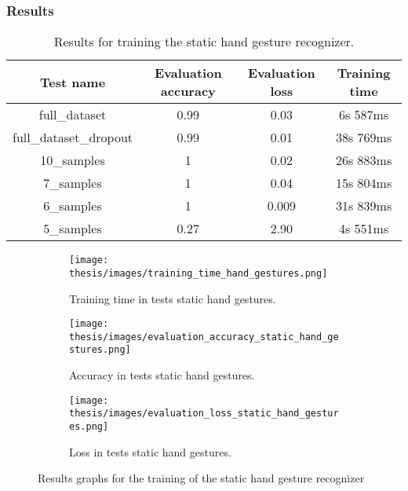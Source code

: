 \documentclass[../thesis.tex]{subfiles}
\begin{document}
\subsubsection{Results}
\begin{table}[H]
\begin{tabular}{|c|c|c|c|}
\hline
\textbf{Test name}          & \textbf{Evaluation accuracy} & \textbf{Evaluation loss} & \textbf{Training time} \\ \hline
full\_dataset               & 0.99                         & 0.03                     & 6s 587ms               \\ \hline
full\_dataset\_dropout & 0.99                         & 0.01                     & 38s 769ms              \\ \hline
10\_samples                 & 1                            & 0.02                     & 26s 883ms              \\ \hline
7\_samples                  & 1                            & 0.04                     & 15s 804ms              \\ \hline
6\_samples                  & 1                            & 0.009                    & 31s 839ms              \\ \hline
5\_samples                  & 0.27                         & 2.90                     & 4s 551ms               \\ \hline
\end{tabular}
\caption{Results for training the static hand gesture recognizer.}
\label{tab:result_static_hand_gestures}
\end{table}

\begin{figure}[H]
     \centering
     \begin{subfigure}[b]{0.45\textwidth}
         \centering
         \texttt{[image: thesis/images/training\_time\_hand\_gestures.png]}
         \caption{Training time in tests static hand gestures.}
         \label{fig:training_time_static_hand_gestures}
     \end{subfigure}
     \hfill
     \begin{subfigure}[b]{0.45\textwidth}
         \centering
         \texttt{[image: thesis/images/evaluation\_accuracy\_static\_hand\_gestures.png]}
         \caption{Accuracy in tests static hand gestures.}
         \label{fig:evaluation_accuracy_static_hand_gestures}
     \end{subfigure}
     \hfill
     \begin{subfigure}[b]{0.45\textwidth}
         \centering
         \texttt{[image: thesis/images/evaluation\_loss\_static\_hand\_gestures.png]}
         \caption{Loss in tests static hand gestures.}
         \label{fig:evaluation_loss_static_hand_gestures.}
     \end{subfigure}
        \caption{Results graphs for the training of the static hand gesture recognizer}
        \label{fig:results_graphs_static_hand_gestures}
\end{figure}
\end{document}
